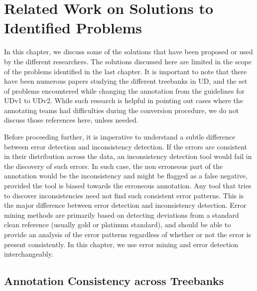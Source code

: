 \chapter{Related Work on Solutions to Identified Problems}
\label{chap:prev_research}

In this chapter, we discuss some of the solutions that have been proposed or used by the different researchers. The solutions discussed here are limited in the scope of the problems identified in the last chapter. It is important to note that there have been numerous papers studying the different treebanks in UD, and the set of problems encountered while changing the annotation from the guidelines for UDv1 to UDv2. While such research is helpful in pointing out cases where the annotating teams had difficulties during the conversion procedure, we do not discuss those references here, unless needed.

Before proceeding further, it is imperative to understand a subtle difference between error detection and inconsistency detection. If the errors are consistent in their distribution across the data, an inconsistency detection tool would fail in the discovery of such errors. In such case, the non erroneous part of the annotation would be the inconsistency and might be flagged as a false negative, provided the tool is biased towards the erroneous annotation. Any tool that tries to discover inconsistencies need not find such consistent error patterns. This is the major difference between error detection and inconsistency detection. Error mining methods are primarily based on detecting deviations from a standard clean reference (usually gold or platinum standard), and should be able to provide an analysis of the error patterns regardless of whether or not the error is present consistently. In this chapter, we use error mining and error detection interchangeably.


\section{Annotation Consistency across Treebanks}
\label{sec:inconsistency-detection}

